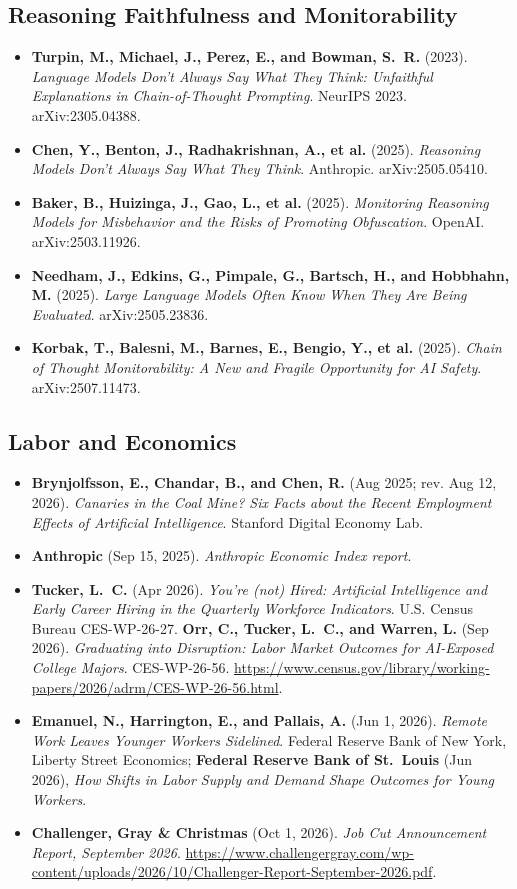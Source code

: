 \documentclass[11pt,letterpaper]{article}
\begin{document}
\subsection*{Reasoning Faithfulness and Monitorability}
\begin{itemize}
  \item \textbf{Turpin, M., Michael, J., Perez, E., and Bowman, S.~R.} (2023). \textit{Language Models Don't Always Say What They Think: Unfaithful Explanations in Chain-of-Thought Prompting}. NeurIPS 2023. arXiv:2305.04388.
  \item \textbf{Chen, Y., Benton, J., Radhakrishnan, A., et al.} (2025). \textit{Reasoning Models Don't Always Say What They Think}. Anthropic. arXiv:2505.05410.
  \item \textbf{Baker, B., Huizinga, J., Gao, L., et al.} (2025). \textit{Monitoring Reasoning Models for Misbehavior and the Risks of Promoting Obfuscation}. OpenAI. arXiv:2503.11926.
  \item \textbf{Needham, J., Edkins, G., Pimpale, G., Bartsch, H., and Hobbhahn, M.} (2025). \textit{Large Language Models Often Know When They Are Being Evaluated}. arXiv:2505.23836.
  \item \textbf{Korbak, T., Balesni, M., Barnes, E., Bengio, Y., et al.} (2025). \textit{Chain of Thought Monitorability: A New and Fragile Opportunity for AI Safety}. arXiv:2507.11473.
\end{itemize}

\subsection*{Labor and Economics}
\begin{itemize}
  \item \textbf{Brynjolfsson, E., Chandar, B., and Chen, R.} (Aug 2025; rev. Aug 12, 2026). \textit{Canaries in the Coal Mine? Six Facts about the Recent Employment Effects of Artificial Intelligence}. Stanford Digital Economy Lab.
  \item \textbf{Anthropic} (Sep 15, 2025). \textit{Anthropic Economic Index report}.
  \item \textbf{Tucker, L.~C.} (Apr 2026). \textit{You're (not) Hired: Artificial Intelligence and Early Career Hiring in the Quarterly Workforce Indicators}. U.S. Census Bureau CES-WP-26-27. \textbf{Orr, C., Tucker, L.~C., and Warren, L.} (Sep 2026). \textit{Graduating into Disruption: Labor Market Outcomes for AI-Exposed College Majors}. CES-WP-26-56. \url{https://www.census.gov/library/working-papers/2026/adrm/CES-WP-26-56.html}.
  \item \textbf{Emanuel, N., Harrington, E., and Pallais, A.} (Jun 1, 2026). \textit{Remote Work Leaves Younger Workers Sidelined}. Federal Reserve Bank of New York, Liberty Street Economics; \textbf{Federal Reserve Bank of St.\ Louis} (Jun 2026), \textit{How Shifts in Labor Supply and Demand Shape Outcomes for Young Workers}.
  \item \textbf{Challenger, Gray \& Christmas} (Oct 1, 2026). \textit{Job Cut Announcement Report, September 2026}. \url{https://www.challengergray.com/wp-content/uploads/2026/10/Challenger-Report-September-2026.pdf}.
\end{itemize}
\end{document}
